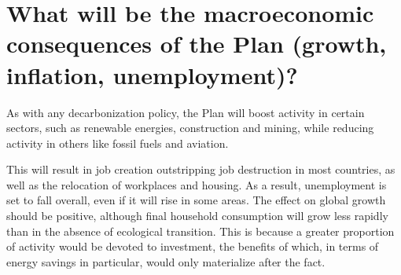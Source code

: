 \documentclass[a5paper,english,openany]{memoir}
\begin{document}
\section*{\normalsize What will be the macroeconomic consequences of the Plan (growth, inflation, unemployment)?}\label{q:macro}

As with any decarbonization %
policy, the Plan will boost activity in certain sectors, such as renewable energies, construction %
and mining, %
while reducing activity in others like fossil fuels and aviation. %

This will result in job creation outstripping job destruction in most countries, as well as the relocation of workplaces and housing. As a result, unemployment is set to fall overall, even if it will rise in some areas. The effect on global growth should be positive, although final household consumption will grow less rapidly than in the absence of ecological transition. %
This is because a greater proportion of activity would be devoted to investment, the benefits of which, in terms of energy savings in particular, %
would only materialize %
after the fact. 
\end{document}

